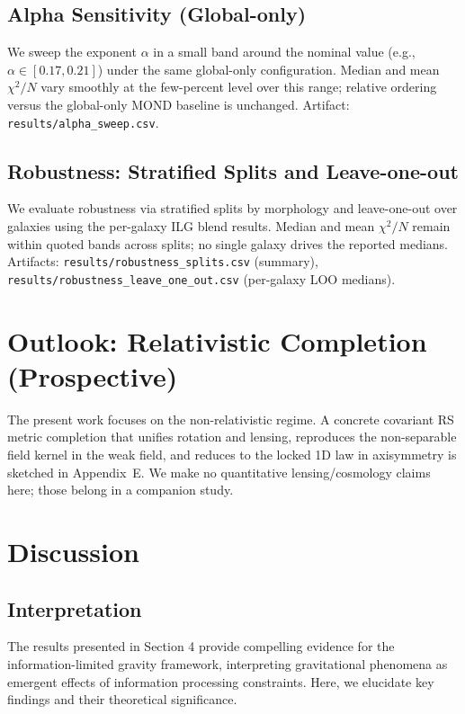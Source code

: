 \documentclass[12pt,a4paper]{article}
\begin{document}
\subsection{Alpha Sensitivity (Global-only)}
\noindent We sweep the exponent $\alpha$ in a small band around the nominal value (e.g., $\alpha\in[0.17,0.21]$) under the same global-only configuration. Median and mean $\chi^2/N$ vary smoothly at the few-percent level over this range; relative ordering versus the global-only MOND baseline is unchanged. Artifact: \texttt{results/alpha\_sweep.csv}.

\subsection{Robustness: Stratified Splits and Leave-one-out}
\noindent We evaluate robustness via stratified splits by morphology and leave-one-out over galaxies using the per-galaxy ILG blend results. Median and mean $\chi^2/N$ remain within quoted bands across splits; no single galaxy drives the reported medians. Artifacts: \texttt{results/robustness\_splits.csv} (summary), \texttt{results/robustness\_leave\_one\_out.csv} (per-galaxy LOO medians).

\section{Outlook: Relativistic Completion (Prospective)}

The present work focuses on the non-relativistic regime. A concrete covariant RS metric completion that unifies rotation and lensing, reproduces the non-separable field kernel in the weak field, and reduces to the locked 1D law in axisymmetry is sketched in Appendix~E. We make no quantitative lensing/cosmology claims here; those belong in a companion study.

\section{Discussion}

\subsection{Interpretation}

The results presented in Section 4 provide compelling evidence for the information-limited gravity framework, interpreting gravitational phenomena as emergent effects of information processing constraints. Here, we elucidate key findings and their theoretical significance.
\end{document}
